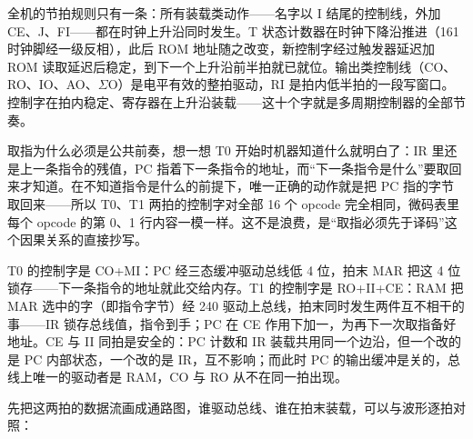 全机的节拍规则只有一条：所有装载类动作——名字以 I 结尾的控制线，外加 CE、J、FI——都在时钟上升沿同时发生。T 状态计数器在时钟下降沿推进（161 时钟脚经一级反相），此后 ROM 地址随之改变，新控制字经过触发器延迟加 ROM 读取延迟后稳定，到下一个上升沿前半拍就已就位。输出类控制线（CO、RO、IO、AO、$\Sigma$O）是电平有效的整拍驱动，RI 是拍内低半拍的一段写窗口。控制字在拍内稳定、寄存器在上升沿装载——这十个字就是多周期控制器的全部节奏。

取指为什么必须是公共前奏，想一想 T0 开始时机器知道什么就明白了：IR 里还是上一条指令的残值，PC 指着下一条指令的地址，而“下一条指令是什么”要取回来才知道。在不知道指令是什么的前提下，唯一正确的动作就是把 PC 指的字节取回来——所以 T0、T1 两拍的控制字对全部 16 个 opcode 完全相同，微码表里每个 opcode 的第 0、1 行内容一模一样。这不是浪费，是“取指必须先于译码”这个因果关系的直接抄写。

T0 的控制字是 CO+MI：PC 经三态缓冲驱动总线低 4 位，拍末 MAR 把这 4 位锁存——下一条指令的地址就此交给内存。T1 的控制字是 RO+II+CE：RAM 把 MAR 选中的字（即指令字节）经 240 驱动上总线，拍末同时发生两件互不相干的事——IR 锁存总线值，指令到手；PC 在 CE 作用下加一，为再下一次取指备好地址。CE 与 II 同拍是安全的：PC 计数和 IR 装载共用同一个边沿，但一个改的是 PC 内部状态，一个改的是 IR，互不影响；而此时 PC 的输出缓冲是关的，总线上唯一的驱动者是 RAM，CO 与 RO 从不在同一拍出现。

先把这两拍的数据流画成通路图，谁驱动总线、谁在拍末装载，可以与波形逐拍对照：

